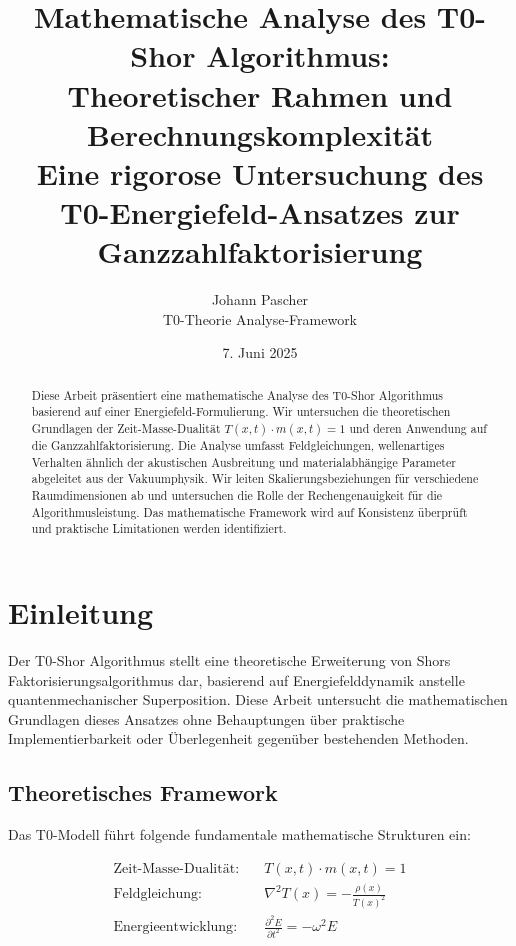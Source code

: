 \documentclass[12pt,a4paper]{article}
\title{Mathematische Analyse des T0-Shor Algorithmus: \\
	Theoretischer Rahmen und Berechnungskomplexität \\
	\large Eine rigorose Untersuchung des T0-Energiefeld-Ansatzes zur Ganzzahlfaktorisierung}
\author{Johann Pascher \\
	T0-Theorie Analyse-Framework}
\date{7. Juni 2025}
\begin{document}
	
	\maketitle
	
	\begin{abstract}
		Diese Arbeit präsentiert eine mathematische Analyse des T0-Shor Algorithmus basierend auf einer Energiefeld-Formulierung. Wir untersuchen die theoretischen Grundlagen der Zeit-Masse-Dualität $T(x,t) \cdot m(x,t) = 1$ und deren Anwendung auf die Ganzzahlfaktorisierung. Die Analyse umfasst Feldgleichungen, wellenartiges Verhalten ähnlich der akustischen Ausbreitung und materialabhängige Parameter abgeleitet aus der Vakuumphysik. Wir leiten Skalierungsbeziehungen für verschiedene Raumdimensionen ab und untersuchen die Rolle der Rechengenauigkeit für die Algorithmusleistung. Das mathematische Framework wird auf Konsistenz überprüft und praktische Limitationen werden identifiziert.
	\end{abstract}
	
	\tableofcontents
	\newpage
	
	\section{Einleitung}
	
	Der T0-Shor Algorithmus stellt eine theoretische Erweiterung von Shors Faktorisierungsalgorithmus dar, basierend auf Energiefelddynamik anstelle quantenmechanischer Superposition. Diese Arbeit untersucht die mathematischen Grundlagen dieses Ansatzes ohne Behauptungen über praktische Implementierbarkeit oder Überlegenheit gegenüber bestehenden Methoden.
	
	\subsection{Theoretisches Framework}
	
	Das T0-Modell führt folgende fundamentale mathematische Strukturen ein:
	
	\begin{align}
		\text{Zeit-Masse-Dualität}: \quad &T(x,t) \cdot m(x,t) = 1 \label{eq:duality}\\
		\text{Feldgleichung}: \quad &\nabla^2 T(x) = -\frac{\rho(x)}{T(x)^2} \label{eq:field}\\
		\text{Energieentwicklung}: \quad &\frac{\partial^2 E}{\partial t^2} = -\omega^2 E \label{eq:evolution}
	\end{align}
	
\end{document}
